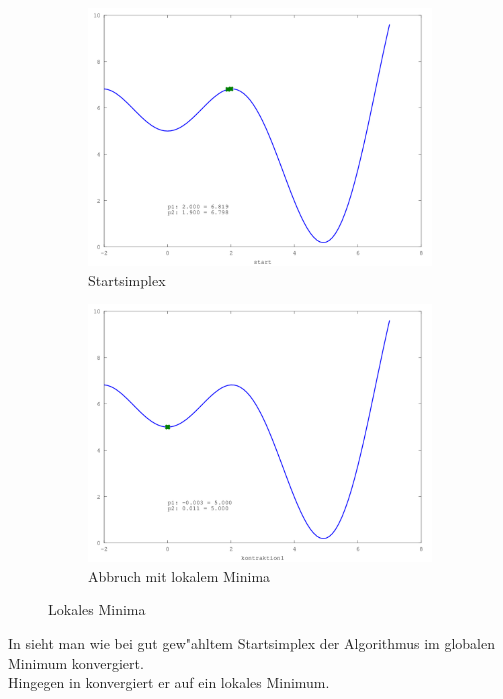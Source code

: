 \begin{figure}[htb]
\centering
\begin{subfigure}[b]{0.49\textwidth}
\centering
\includegraphics[width=\textwidth]{downhill/lok_sinx_x001.png}
\caption{Startsimplex}
\end{subfigure} \begin{subfigure}[b]{0.49\textwidth}
\centering
\includegraphics[width=\textwidth]{downhill/lok_sinx_x010.png}
\caption{Abbruch mit lokalem Minima}
\end{subfigure}

\caption{Lokales Minima}
\label{fig:downhillLokMinima}
\end{figure}

In  sieht man wie bei gut gew"ahltem Startsimplex der Algorithmus im globalen Minimum konvergiert.\\
Hingegen in  konvergiert er auf ein lokales Minimum.



